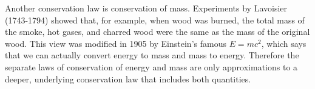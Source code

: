 Another conservation law is conservation of mass. Experiments by Lavoisier (1743-1794)
showed that, for example, when wood was burned, the total mass of the smoke, hot gases,
and charred wood were the same as the mass of the original wood.
This view was modified in 1905 by Einstein's famous
$E=mc^2$, which says that we can actually convert energy to mass and mass to energy.
Therefore the separate laws of conservation of energy and mass are only approximations
to a deeper, underlying conservation law that includes both quantities.
